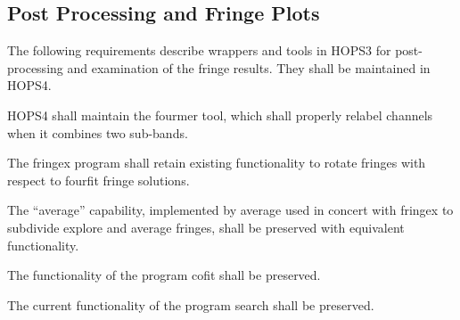 
\subsection{Post Processing and Fringe Plots}
\label{sec:postprocreq}

The following requirements describe wrappers and tools in HOPS3 for
post-processing and examination of the fringe results. They shall be
maintained in HOPS4.


\begin{description}
 HOPS4 shall maintain the \acs{fourmer} tool, which shall properly
relabel channels when it combines two sub-bands.

 The \acs{fringex} program shall retain existing functionality to rotate
fringes with respect to fourfit fringe solutions.

 The ``average'' capability, implemented by \acs{average} used in
concert with \acs{fringex} to subdivide explore and average fringes, shall be
preserved with equivalent functionality.

 The functionality of the program \acs{cofit} shall be preserved.

 The current functionality of the program \acs{search} shall be
preserved.



\end{description}
